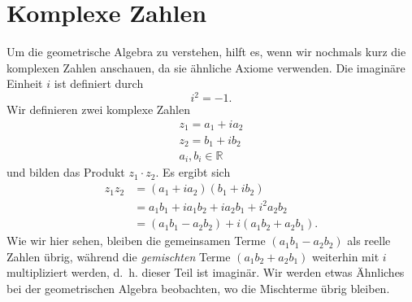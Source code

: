 %
%
%
%
\section{Komplexe Zahlen
\label{geoalgebra:section:komplexe-zahlen}}
Um die geometrische Algebra zu verstehen, hilft es, wenn wir nochmals kurz die komplexen Zahlen anschauen, da sie ähnliche Axiome verwenden.
Die imaginäre Einheit $i$ ist definiert durch
\begin{equation}
  i^2 = -1.
\end{equation}
Wir definieren zwei komplexe Zahlen
\begin{align*}
  z_1 = a_1 + i a_2 \\
  z_2 = b_1 + i b_2 \\ 
  a_i, b_i \in \mathbb{R}
\end{align*}
und bilden das Produkt $z_1 \cdot{} z_2$. Es ergibt sich
\begin{align*}
  z_1 z_2 &= (a_1 + i a_2) (b_1 + i b_2) \\
  &= a_1 b_1 + i a_1 b_2 + i a_2 b_1 + i^2 a_2 b_2 \\
  &= (a_1 b_1 - a_2 b_2) + i (a_1 b_2 + a_2 b_1).
\end{align*}
Wie wir hier sehen, bleiben die gemeinsamen Terme $(a_1 b_1 - a_2 b_2)$ als reelle Zahlen übrig, während die \emph{gemischten} Terme $(a_1 b_2 + a_2 b_1)$ weiterhin mit $i$
multipliziert werden, d.~h. dieser Teil ist imaginär. Wir werden etwas Ähnliches bei der geometrischen Algebra beobachten, wo die Mischterme übrig bleiben.




